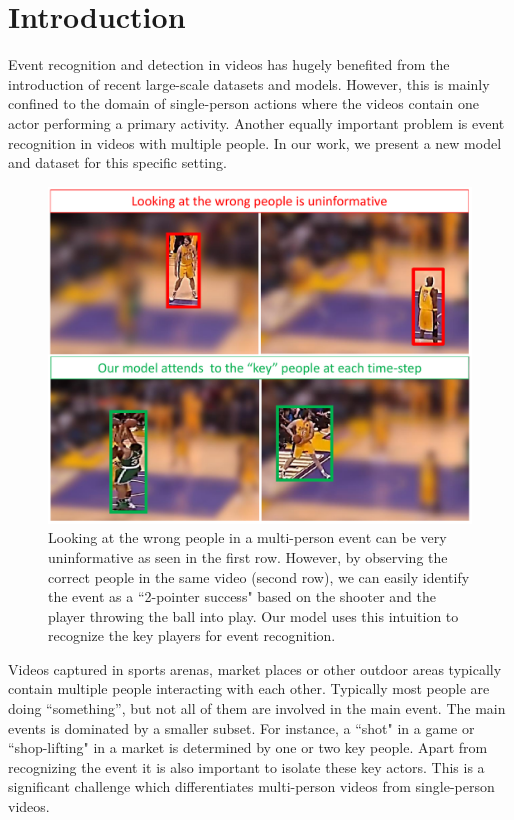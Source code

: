 \section{Introduction}

Event recognition and detection in videos has hugely benefited from the
introduction of recent large-scale datasets \cite{THUMOS,UCF101,Karpathy_CVPR14,MED11} and models.
However, this is mainly confined to the domain of single-person actions
where the videos contain one actor performing a primary activity.
Another equally important problem is event recognition in
videos with multiple people. In our work, we present a new model
and dataset for this specific setting.

\begin{figure}[ht!]
\begin{center}
  \includegraphics[width=3.2 in]{images/pull_figure_v3_cropped.pdf}
\end{center}
\caption{Looking at the wrong people in a multi-person event can be very uninformative
  as seen in the first row. However, by observing the correct people in the same video
  (second row), we can easily identify the event as a ``2-pointer success" based
  on the shooter and
the player throwing the ball into play. Our model uses this intuition
to recognize the key players for event recognition.}
\label{fig:pull_figure}
\end{figure}

Videos captured in sports arenas, market places or other outdoor areas
typically contain multiple people interacting with each other.
Typically most people are doing ``something'', but not all of them are involved in the main event.
The main events is dominated by a smaller subset. For instance, a ``shot" in a game
or ``shop-lifting" in a market is determined by one or two key people.
Apart from recognizing the event it is also important
to isolate these key actors. This is a significant challenge which
differentiates multi-person videos from single-person videos.

